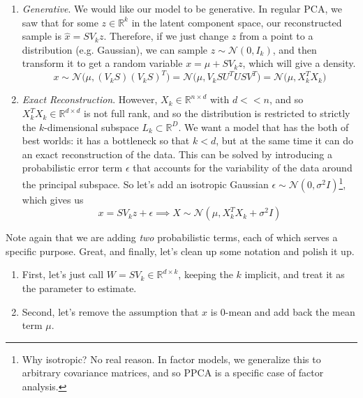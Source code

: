   \begin{enumerate}
    \item \textit{Generative}. We would like our model to be generative. In regular PCA, we saw that for some $z \in \mathbb{R}^k$ in the latent component space, our reconstructed sample is $\hat{x} = S V_k z$. Therefore, if we just change $z$ from a point to a distribution (e.g. Gaussian), we can sample $z \sim \mathcal{N}(0, I_k)$, and then transform it to get a random variable $x = \mu + S V_k z$, which will give a density. 
    \begin{equation}
      x \sim \mathcal{N} \big( \mu, (V_k S)(V_k S)^T \big) = \mathcal{N} \big( \mu, V_k S U^T U S V^T \big) = \mathcal{N} \big( \mu, X_k^T X_k)
    \end{equation} 

    \item \textit{Exact Reconstruction}. However, $X_k \in \mathbb{R}^{n \times d}$ with $d << n$, and so $X_k^T X_k \in \mathbb{R}^{d \times d}$ is not full rank, and so the distribution is restricted to strictly the $k$-dimensional subspace $L_k \subset \mathbb{R}^D$. We want a model that has the both of best worlds: it has a bottleneck so that $k < d$, but at the same time it can do an exact reconstruction of the data. This can be solved by introducing a probabilistic error term $\epsilon$ that accounts for the variability of the data around the principal subspace. So let's add an isotropic Gaussian $\epsilon \sim \mathcal{N}(0, \sigma^2 I)$\footnote{Why isotropic? No real reason. In factor models, we generalize this to arbitrary covariance matrices, and so PPCA is a specific case of factor analysis.}, which gives us 
    \begin{equation}
      x = S V_k z + \epsilon \implies X \sim \mathcal{N}(\mu, X_k^T X_k + \sigma^2 I)
    \end{equation} 
  \end{enumerate} 

  Note again that we are adding \textit{two} probabilistic terms, each of which serves a specific purpose. Great, and finally, let's clean up some notation and polish it up. 
  \begin{enumerate}
    \item First, let's just call $W = S V_k \in \mathbb{R}^{d \times k}$, keeping the $k$ implicit, and treat it as the parameter to estimate. 
    \item Second, let's remove the assumption that $x$ is $0$-mean and add back the mean term $\mu$. 
  \end{enumerate} 


